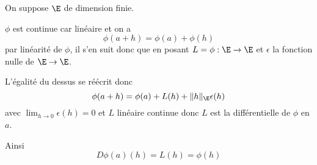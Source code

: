 \documentclass{article}
\begin{document}
\exercice{}
On suppose $\E$ de dimension finie.

$\phi$ est continue car linéaire et on a
\[
\phi(a+h) = \phi(a) + \phi(h)
\]
par linéarité de $\phi$, il s'en suit donc que en posant $L = \phi : \E \rightarrow \E$ et $\epsilon$ la fonction nulle de $\E \rightarrow \E$.

L'égalité du dessus se réécrit donc
\[
\phi(a+h) = \phi(a) + L(h) + \Vert h \Vert_\E \epsilon(h)
\]
avec $\lim_{h \to 0} \epsilon(h) = 0$ et $L$ linéaire continue donc $L$ est la différentielle de $\phi$ en $a$.

Ainsi
\[
D\phi(a)(h) = L(h) = \phi(h)
\]

\exercice{}

\exercice{}
\end{document}
